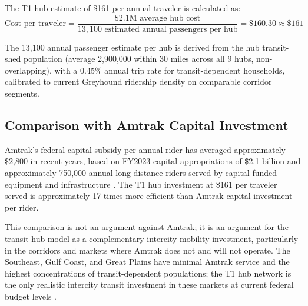 The T1 hub estimate of \$161 per annual traveler is calculated as:
\begin{equation}
\text{Cost per traveler} = \frac{\$2.1\text{M average hub cost}}{13{,}100 \text{ estimated annual passengers per hub}} = \$160.30 \approx \$161
\end{equation}

The 13,100 annual passenger estimate per hub is derived from the hub transit-shed population (average 2,900,000 within 30 miles across all 9 hubs, non-overlapping), with a 0.45\% annual trip rate for transit-dependent households, calibrated to current Greyhound ridership density on comparable corridor segments.

\subsection{Comparison with Amtrak Capital Investment}

Amtrak's federal capital subsidy per annual rider has averaged approximately \$2,800 in recent years, based on FY2023 capital appropriations of \$2.1 billion and approximately 750,000 annual long-distance riders served by capital-funded equipment and infrastructure \citep{Amtrak2023}. The T1 hub investment at \$161 per traveler served is approximately 17 times more efficient than Amtrak capital investment per rider.

This comparison is not an argument against Amtrak; it is an argument for the transit hub model as a complementary intercity mobility investment, particularly in the corridors and markets where Amtrak does not and will not operate. The Southeast, Gulf Coast, and Great Plains have minimal Amtrak service and the highest concentrations of transit-dependent populations; the T1 hub network is the only realistic intercity transit investment in these markets at current federal budget levels \citep{IIJA2021}.
